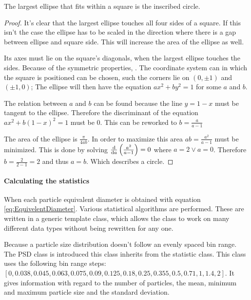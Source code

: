 \documentclass[11pt,fleqn,,a4paper,twoside,openright]{book}
\begin{document}
\begin{theorem}
	\label{theo:ellipcircle}
	The largest ellipse that fits within a square is the inscribed circle. 
	
	\begin{proof}
		It's clear that the largest ellipse touches all four sides of a square. If this isn't the case the ellipse has to be scaled in the direction where there is a gap between ellipse and square side. This will increase the area of the ellipse as well.
		
		Its axes must lie on the square's diagonals, when the largest ellipse touches the sides. Because of the symmetric properties, . The coordinate system can in which the square is positioned can be chosen, such the corners lie on $ (0,\pm1) $ and $ (\pm1, 0) $; The ellipse will then have the equation $ ax^2 + by^2 = 1 $ for some $ a $ and $ b $.
		
		The relation between $ a $ and $ b $ can be found because the line $ y = 1 - x $ must be tangent to the ellipse. Therefore the discriminant of the equation $ ax^2 + b(1 - x)^2 = 1 $ must be 0. This can be reworked to $ b = \frac{a}{a-1}$
		
		The area of the ellipse is $ \frac{\pi}{4ab} $. In order to maximize this area $ ab = \frac{a^2}{a - 1} $ must be minimized. This is done by solving $ \frac{\dif}{\dif a}\left(\frac{a^2}{a - 1}\right) = 0 $ where $ a = 2 \vee a = 0 $. Therefore $ b = \frac{2}{2 - 1} = 2 $ and thus $ a = b $. Which describes a circle.
	\end{proof}
	
\end{theorem}

\paragraph{Calculating the statistics}
When each particle equivalent diameter is obtained with equation \ref{eq:EquivelentDiameter}. Various statistical algorithms are performed. These are written in a generic template class, which allows the class to work on many different data types without being rewritten for any one. 

Because a particle size distribution doesn't follow an evenly spaced bin range. The PSD class is introduced this class inherits from the statistic class. This class uses the following bin range steps: \\ $ [0, 0.038, 0.045, 0.063, 0.075, 0.09, 0.125, 0.18, 0.25, 0.355, 0.5, 0.71, 1, 1.4, 2] $. It gives information with regard to the number of particles, the mean, minimum and maximum particle size and the standard deviation.
\end{document}
